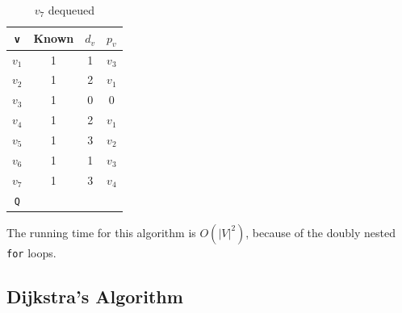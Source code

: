 \begin{minipage}{0.33\textwidth}
  \begin{table}[H]
    \centering
    \begin{tabular}{c|c|c|c}
        \toprule
        \verb|v| & Known & \(d_v\) & \(p_v\)  \\
      \midrule
        \(v_1\) & 1 & 1 & \(v_3\)  \\
        \(v_2\) & 1 & 2 & \(v_1\)  \\
        \(v_3\) & 1 & 0 & 0  \\
        \(v_4\) & 1 & 2 & \(v_1\)  \\
        \(v_5\) & 1 & 3 & \(v_2\)   \\
        \(v_6\) & 1 & 1 & \(v_3\)  \\
        \(v_7\) & 1 & 3 & \(v_4\)  \\
      \midrule
        \verb|Q| & \multicolumn{3}{c}{} \\
      \bottomrule
    \end{tabular}
    \caption*{\(v_7\) dequeued}
  \end{table}
\end{minipage}

The running time for this algorithm is \(O(\vert V \vert^2)\), because of the doubly nested \texttt{for} loops.

\subsection{Dijkstra's Algorithm}